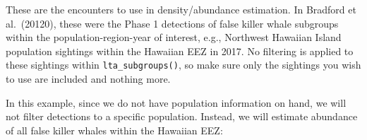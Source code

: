 \documentclass[
]{book}
\newenvironment{Shaded}{\begin{snugshade}}{\end{snugshade}}
\newcommand{\ConstantTok}[1]{\textcolor[rgb]{0.00,0.00,0.00}{#1}}
\newcommand{\DecValTok}[1]{\textcolor[rgb]{0.00,0.00,0.81}{#1}}
\newcommand{\FunctionTok}[1]{\textcolor[rgb]{0.00,0.00,0.00}{#1}}
\newcommand{\NormalTok}[1]{#1}
\newcommand{\OtherTok}[1]{\textcolor[rgb]{0.56,0.35,0.01}{#1}}
\newcommand{\SpecialCharTok}[1]{\textcolor[rgb]{0.00,0.00,0.00}{#1}}
\newcommand{\StringTok}[1]{\textcolor[rgb]{0.31,0.60,0.02}{#1}}
\begin{document}
These are the encounters to use in density/abundance estimation. In Bradford et al.~(20120), these were the Phase 1 detections of false killer whale subgroups within the population-region-year of interest, e.g., Northwest Hawaiian Island population sightings within the Hawaiian EEZ in 2017. No filtering is applied to these sightings within \texttt{lta\_subgroups()}, so make sure only the sightings you wish to use are included and nothing more.

In this example, since we do not have population information on hand, we will not filter detections to a specific population. Instead, we will estimate abundance of all false killer whales within the Hawaiian EEZ:

\begin{Shaded}
\end{Shaded}
\end{document}
